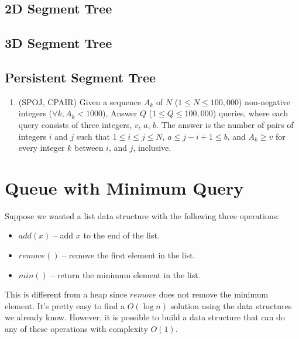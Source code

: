 \documentclass[11pt]{book}
\begin{document}
\subsection{2D Segment Tree}

\subsection{3D Segment Tree}

\subsection{Persistent Segment Tree}

\begin{enumerate}

\item
(SPOJ, CPAIR)
Given a sequence $A_k$ of $N$ ($1 \le N \le 100, 000$) non-negative integers ($\forall k, A_k < 1000$), Answer $Q$ ($1 \le Q \le
100, 000$) queries, where each query consists of three integers, $v$, $a$, $b$. The answer is the number of pairs of
integers $i$ and $j$ such that $1 \le i \le j \le N$, $a \le j - i + 1 \le b$, and $A_k \ge v$ for every integer $k$ between $i$, and
$j$, inclusive.

\end{enumerate}

\section{Queue with Minimum Query}

Suppose we wanted a list data structure with the following three operations:

\begin{itemize}

\item
$add(x)$ -- add $x$ to the end of the list.

\item
$remove()$ -- remove the first element in the list.

\item
$min()$ -- return the minimum element in the list.

\end{itemize}

This is different from a heap since $remove$ does not remove the minimum element. It's pretty easy to find a $O(\log{n})$ solution using the data structures we already know. However, it is possible to build a data structure that can do any of these operations with complexity $O(1)$.
\end{document}
